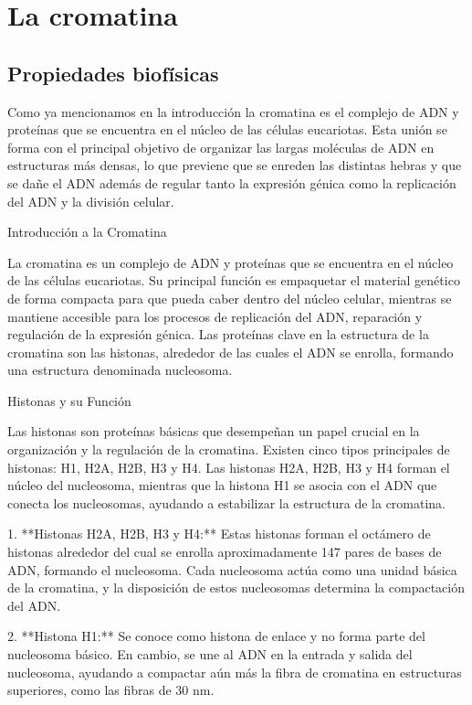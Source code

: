 \chapter{La cromatina}
\label{cap:chromatin}

\section{Propiedades biofísicas}

Como ya mencionamos en la introducción la cromatina es el complejo de ADN y proteínas que se encuentra en el núcleo de las células eucariotas. Esta unión se forma con el principal objetivo de organizar las largas moléculas de ADN en estructuras más densas, lo que previene que se enreden las distintas hebras y que se dañe el ADN además de regular tanto la expresión génica como la replicación del ADN y la división celular.

Introducción a la Cromatina

La cromatina es un complejo de ADN y proteínas que se encuentra en el núcleo de las células eucariotas. Su principal función es empaquetar el material genético de forma compacta para que pueda caber dentro del núcleo celular, mientras se mantiene accesible para los procesos de replicación del ADN, reparación y regulación de la expresión génica. Las proteínas clave en la estructura de la cromatina son las histonas, alrededor de las cuales el ADN se enrolla, formando una estructura denominada nucleosoma.

Histonas y su Función

Las histonas son proteínas básicas que desempeñan un papel crucial en la organización y la regulación de la cromatina. Existen cinco tipos principales de histonas: H1, H2A, H2B, H3 y H4. Las histonas H2A, H2B, H3 y H4 forman el núcleo del nucleosoma, mientras que la histona H1 se asocia con el ADN que conecta los nucleosomas, ayudando a estabilizar la estructura de la cromatina.

1. **Histonas H2A, H2B, H3 y H4:** Estas histonas forman el octámero de histonas alrededor del cual se enrolla aproximadamente 147 pares de bases de ADN, formando el nucleosoma. Cada nucleosoma actúa como una unidad básica de la cromatina, y la disposición de estos nucleosomas determina la compactación del ADN.

2. **Histona H1:** Se conoce como histona de enlace y no forma parte del nucleosoma básico. En cambio, se une al ADN en la entrada y salida del nucleosoma, ayudando a compactar aún más la fibra de cromatina en estructuras superiores, como las fibras de 30 nm.

